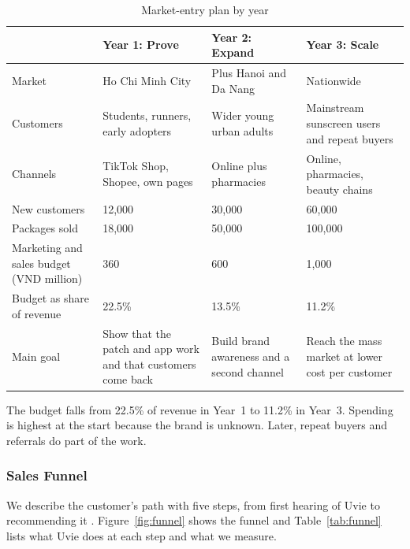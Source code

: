 \begin{table}[ht]
\centering\small
\caption{Market-entry plan by year}\label{tab:phases}
\begin{tabular}{@{}L{3.0cm}L{3.8cm}L{3.8cm}L{3.8cm}@{}}
  \toprule
   & \textbf{Year 1: Prove} & \textbf{Year 2: Expand} & \textbf{Year 3: Scale}\\
  \midrule
  Market & Ho Chi Minh City & Plus Hanoi and Da Nang & Nationwide\\
  \addlinespace
  Customers & Students, runners, early adopters & Wider young urban adults & Mainstream sunscreen users and repeat buyers\\
  \addlinespace
  Channels & TikTok Shop, Shopee, own pages & Online plus pharmacies & Online, pharmacies, beauty chains\\
  \addlinespace
  New customers & 12,000 & 30,000 & 60,000\\
  \addlinespace
  Packages sold & 18,000 & 50,000 & 100,000\\
  \addlinespace
  Marketing and sales budget (VND million) & 360 & 600 & 1,000\\
  \addlinespace
  Budget as share of revenue & 22.5\% & 13.5\% & 11.2\%\\
  \addlinespace
  Main goal & Show that the patch and app work and that customers come back & Build brand awareness and a second channel & Reach the mass market at lower cost per customer\\
  \bottomrule
\end{tabular}
\end{table}

The budget falls from 22.5\% of revenue in Year~1 to 11.2\% in Year~3. Spending is
highest at the start because the brand is unknown. Later, repeat buyers and
referrals do part of the work.

\subsubsection{Sales Funnel}
We describe the customer's path with five steps, from first hearing of Uvie to
recommending it \cite{kotler2017}. Figure~\ref{fig:funnel} shows the funnel and
Table~\ref{tab:funnel} lists what Uvie does at each step and what we measure.

